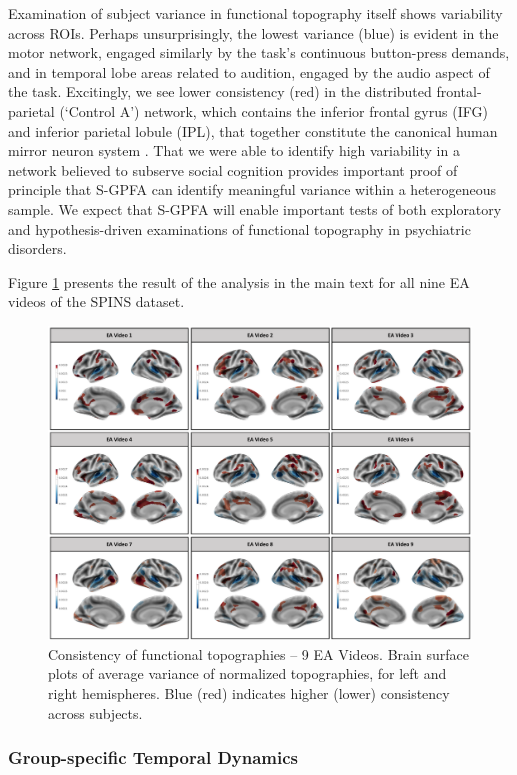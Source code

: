 Examination of subject variance in functional topography itself shows variability across ROIs. Perhaps unsurprisingly, the lowest variance (blue) is evident in the motor network, engaged similarly by the task’s continuous button-press demands, and in temporal lobe areas related to audition, engaged by the audio aspect of the task. Excitingly, we see lower consistency (red) in the distributed frontal-parietal (‘Control A’) network, which contains the inferior frontal gyrus (IFG) and inferior parietal lobule (IPL), that together constitute the canonical human mirror neuron system \cite{iacoboni2006mirror}. That we were able to identify high variability in a network believed to subserve social cognition provides important proof of principle that S-GPFA can identify meaningful variance within a heterogeneous sample. We expect that S-GPFA will enable important tests of both exploratory and hypothesis-driven examinations of functional topography in psychiatric disorders.

Figure \ref{ch1:fig:topo_all} presents the result of the analysis in the main text for all nine EA videos of the SPINS dataset.

\begin{figure}[ht]
    \centering
    \includegraphics[width=0.85\linewidth]{figs/ch1/topo_all.pdf}
    \caption{Consistency of functional topographies -- 9 EA Videos. Brain surface plots of average variance of normalized topographies, for left and right hemispheres. Blue (red) indicates higher (lower) consistency across subjects. }\label{ch1:fig:topo_all}
\end{figure}
\FloatBarrier


\subsubsection{Group-specific Temporal Dynamics}

